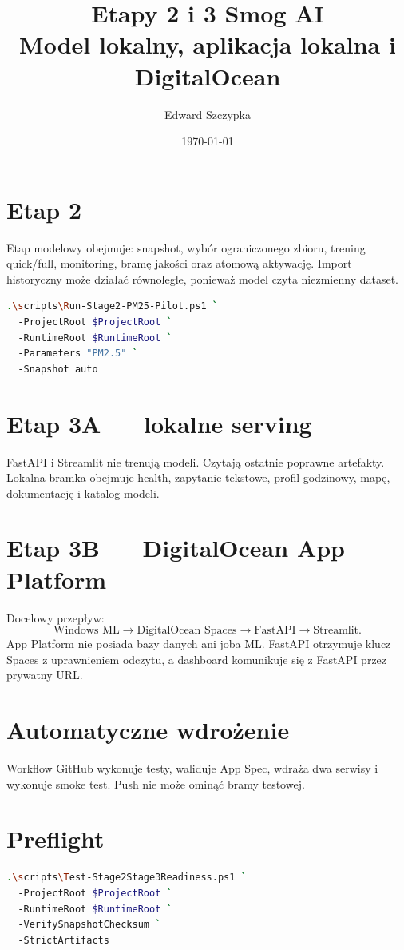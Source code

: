 \documentclass[11pt,a4paper]{article}
\title{Etapy 2 i 3 Smog AI\\Model lokalny, aplikacja lokalna i DigitalOcean}
\author{Edward Szczypka}
\date{\today}
\begin{document}
\maketitle

\section{Etap 2}
Etap modelowy obejmuje: snapshot, wybór ograniczonego zbioru, trening quick/full,
monitoring, bramę jakości oraz atomową aktywację. Import historyczny może działać
równolegle, ponieważ model czyta niezmienny dataset.

\begin{lstlisting}[language=bash]
.\scripts\Run-Stage2-PM25-Pilot.ps1 `
  -ProjectRoot $ProjectRoot `
  -RuntimeRoot $RuntimeRoot `
  -Parameters "PM2.5" `
  -Snapshot auto
\end{lstlisting}

\section{Etap 3A --- lokalne serving}
FastAPI i Streamlit nie trenują modeli. Czytają ostatnie poprawne artefakty.
Lokalna bramka obejmuje health, zapytanie tekstowe, profil godzinowy, mapę,
dokumentację i katalog modeli.

\section{Etap 3B --- DigitalOcean App Platform}
Docelowy przepływ:
\[
 \text{Windows ML}\to\text{DigitalOcean Spaces}\to
 \text{FastAPI}\to\text{Streamlit}.
\]
App Platform nie posiada bazy danych ani joba ML. FastAPI otrzymuje klucz Spaces
z uprawnieniem odczytu, a dashboard komunikuje się z FastAPI przez prywatny URL.

\section{Automatyczne wdrożenie}
Workflow GitHub wykonuje testy, waliduje App Spec, wdraża dwa serwisy i wykonuje
smoke test. Push nie może ominąć bramy testowej.

\section{Preflight}
\begin{lstlisting}[language=bash]
.\scripts\Test-Stage2Stage3Readiness.ps1 `
  -ProjectRoot $ProjectRoot `
  -RuntimeRoot $RuntimeRoot `
  -VerifySnapshotChecksum `
  -StrictArtifacts
\end{lstlisting}
\end{document}
